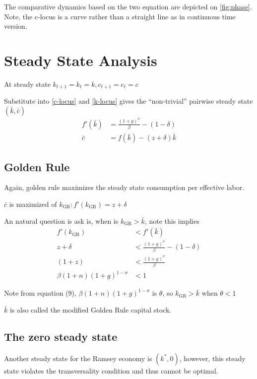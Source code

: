 \documentclass[twocolumn, fleqn]{article}
\begin{document}
		The comparative dynamics based on the two equation are depicted on \eqref{fig:phase}.
		Note, the c-locus is a curve rather than a straight line as in continuous time version.

		\section{Steady State Analysis}\label{sec:steady-state-analysis}
		At steady state $k_{t+1} = k_t = k, c_{t+1}=c_t = c$

		Substitute into \eqref{c-locus} and \eqref{k-locus} gives the ``non-trivial'' pairwise steady state $(\bar{k}, \bar{c})$
		\begin{align}
			f'(\bar{k}) &= \frac{(1+g)^\sigma}{\beta} - (1-\delta)\\
			\bar{c} &= f(\bar{k}) - (z+\delta)\bar{k}
		\end{align}

		\subsection{Golden Rule}\label{subsec:golden-rule}
			Again, golden rule maximizes the steady state consumption per effective labor.

			$\bar{c}$ is maximized of $k_{\text{GR}}: f'(k_{\text{GR}})= z +\delta$

			An natural question is ask is, when is $k_{\text{GR}}>\bar k$, note this implies
			\begin{align*}
				f'(k_{\text{GR}}) &<f'(\bar{k})\\
				z+\delta &< \frac{(1+g)^\sigma}{\beta} - (1-\delta)\\
				(1+z) &< \frac{(1+g)^\sigma}{\beta}\\
				\beta(1+n)(1+g)^{1-\sigma} &<1
			\end{align*}

			Note from equation (9), $\beta(1+n)(1+g)^{1-\sigma}$ is $\theta$, so $k_{\text{GR}}>\bar k$ when $\theta<1$

			$\bar{k}$ is also called the modified Golden Rule capital stock.

		\subsection{The zero steady state}\label{subsec:the-zero-steady-state}

			Another steady state for the Ramsey economy is $(k^\ast, 0)$, however, this steady state violates the
			transversality condition and thus cannot be optimal.
\end{document}
